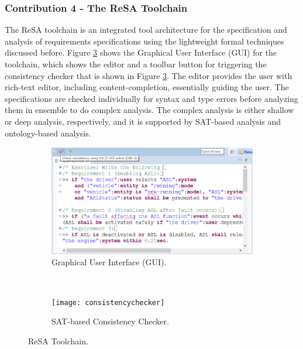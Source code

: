 \subsubsection{Contribution 4 - The ReSA Toolchain}
The ReSA toolchain \cite{resatool} is an integrated tool architecture for the specification and analysis of requirements specifications using the lightweight formal techniques discussed before. Figure \ref{fig_consistencychecker} shows the Graphical User Interface (GUI) for the toolchain, which shows the editor and a toolbar button for triggering the consistency checker that is shown in Figure \ref{fig_consistencychecker}. The editor provides the user with rich-text editor, including content-completion, essentially guiding the user. The specifications are checked individually for syntax and type errors before analyzing them in ensemble to do complex analysis. The complex analysis is either shallow or deep analysis, respectively, and it is supported by SAT-based analysis and ontology-based analysis.
\begin{figure}
    \centering
    \begin{subfigure}[b]{0.475  \textwidth}
        \includegraphics[width=\textwidth]{resa_editor}
        \caption{Graphical User Interface (GUI).}
        \label{fig_gui}
    \end{subfigure}
    ~
        \begin{subfigure}[b]{0.475\textwidth}
        \texttt{[image: consistencychecker]}
        \caption{SAT-based Consistency Checker.}
        \label{fig_power}
    \end{subfigure}
    \caption{ReSA Toolchain.}
    \label{fig_consistencychecker}
\end{figure}

